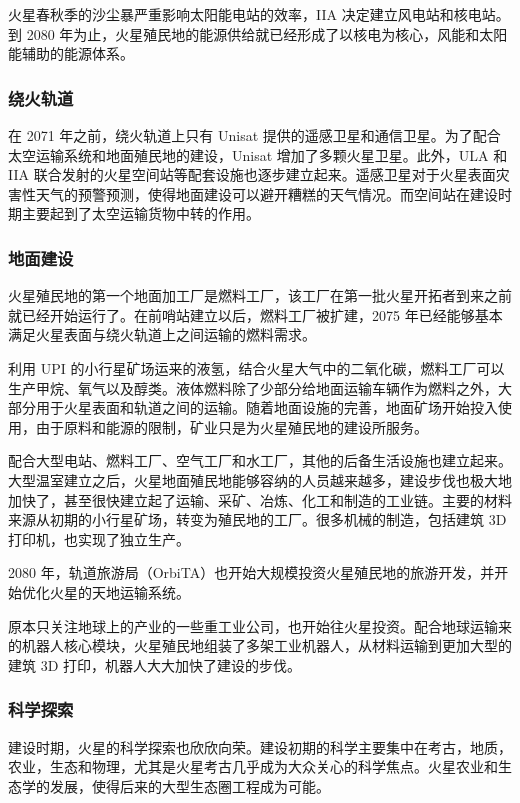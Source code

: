 \documentclass[letterpaper,10pt]{sphinxmanual}
\begin{document}
火星春秋季的沙尘暴严重影响太阳能电站的效率，IIA 决定建立风电站和核电站。到 2080 年为止，火星殖民地的能源供给就已经形成了以核电为核心，风能和太阳能辅助的能源体系。


\subsubsection{绕火轨道}
\label{history:id24}
在 2071 年之前，绕火轨道上只有 Unisat 提供的遥感卫星和通信卫星。为了配合太空运输系统和地面殖民地的建设，Unisat 增加了多颗火星卫星。此外，ULA 和 IIA 联合发射的火星空间站等配套设施也逐步建立起来。遥感卫星对于火星表面灾害性天气的预警预测，使得地面建设可以避开糟糕的天气情况。而空间站在建设时期主要起到了太空运输货物中转的作用。


\subsubsection{地面建设}
\label{history:id25}
火星殖民地的第一个地面加工厂是燃料工厂，该工厂在第一批火星开拓者到来之前就已经开始运行了。在前哨站建立以后，燃料工厂被扩建，2075 年已经能够基本满足火星表面与绕火轨道上之间运输的燃料需求。

利用 UPI 的小行星矿场运来的液氢，结合火星大气中的二氧化碳，燃料工厂可以生产甲烷、氧气以及醇类。液体燃料除了少部分给地面运输车辆作为燃料之外，大部分用于火星表面和轨道之间的运输。随着地面设施的完善，地面矿场开始投入使用，由于原料和能源的限制，矿业只是为火星殖民地的建设所服务。

配合大型电站、燃料工厂、空气工厂和水工厂，其他的后备生活设施也建立起来。大型温室建立之后，火星地面殖民地能够容纳的人员越来越多，建设步伐也极大地加快了，甚至很快建立起了运输、采矿、冶炼、化工和制造的工业链。主要的材料来源从初期的小行星矿场，转变为殖民地的工厂。很多机械的制造，包括建筑 3D 打印机，也实现了独立生产。

2080 年，轨道旅游局（OrbiTA）也开始大规模投资火星殖民地的旅游开发，并开始优化火星的天地运输系统。

原本只关注地球上的产业的一些重工业公司，也开始往火星投资。配合地球运输来的机器人核心模块，火星殖民地组装了多架工业机器人，从材料运输到更加大型的建筑 3D 打印，机器人大大加快了建设的步伐。


\subsubsection{科学探索}
\label{history:id26}
建设时期，火星的科学探索也欣欣向荣。建设初期的科学主要集中在考古，地质，农业，生态和物理，尤其是火星考古几乎成为大众关心的科学焦点。火星农业和生态学的发展，使得后来的大型生态圈工程成为可能。
\end{document}
